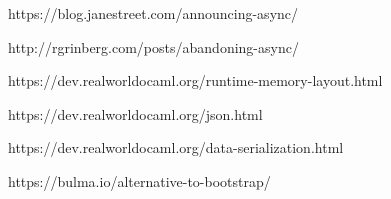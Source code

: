\begin{thebibliography}{00}
    https://blog.janestreet.com/announcing-async/ \TODO

    http://rgrinberg.com/posts/abandoning-async/ \TODO

    https://dev.realworldocaml.org/runtime-memory-layout.html \TODO

    https://dev.realworldocaml.org/json.html \TODO

    https://dev.realworldocaml.org/data-serialization.html \TODO

    https://bulma.io/alternative-to-bootstrap/ \TODO

\end{thebibliography}
\endgroup

